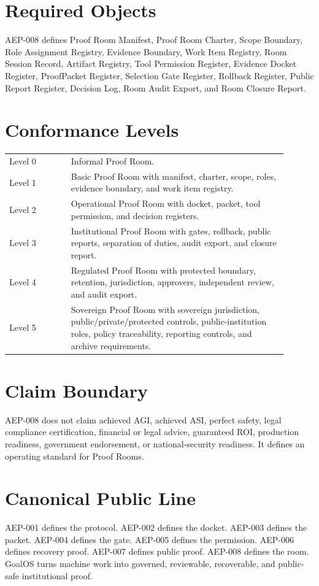 \documentclass[11pt]{article}
\begin{document}
\section{Required Objects}
AEP-008 defines Proof Room Manifest, Proof Room Charter, Scope Boundary, Role Assignment Registry, Evidence Boundary, Work Item Registry, Room Session Record, Artifact Registry, Tool Permission Register, Evidence Docket Register, ProofPacket Register, Selection Gate Register, Rollback Register, Public Report Register, Decision Log, Room Audit Export, and Room Closure Report.

\section{Conformance Levels}
\begin{longtable}{p{0.20\linewidth}p{0.70\linewidth}}
Level 0 & Informal Proof Room.\\
Level 1 & Basic Proof Room with manifest, charter, scope, roles, evidence boundary, and work item registry.\\
Level 2 & Operational Proof Room with docket, packet, tool permission, and decision registers.\\
Level 3 & Institutional Proof Room with gates, rollback, public reports, separation of duties, audit export, and closure report.\\
Level 4 & Regulated Proof Room with protected boundary, retention, jurisdiction, approvers, independent review, and audit export.\\
Level 5 & Sovereign Proof Room with sovereign jurisdiction, public/private/protected controls, public-institution roles, policy traceability, reporting controls, and archive requirements.\\
\end{longtable}

\section{Claim Boundary}
AEP-008 does not claim achieved AGI, achieved ASI, perfect safety, legal compliance certification, financial or legal advice, guaranteed ROI, production readiness, government endorsement, or national-security readiness. It defines an operating standard for Proof Rooms.

\section*{Canonical Public Line}
AEP-001 defines the protocol. AEP-002 defines the docket. AEP-003 defines the packet. AEP-004 defines the gate. AEP-005 defines the permission. AEP-006 defines recovery proof. AEP-007 defines public proof. AEP-008 defines the room. GoalOS turns machine work into governed, reviewable, recoverable, and public-safe institutional proof.
\end{document}
